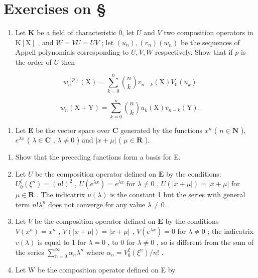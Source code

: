 \section*{Exercises on \S{}}
{}

\begin{enumerate}
\def\labelenumi{\arabic{enumi})}
\tightlist
\item
  Let \(\mathbf{K}\) be a field of characteristic 0, let \(U\) and \(V\) two composition operators in \(\mathrm{K}[\mathrm{X}]\) , and \(W = VU = UV\) ; let \((u_n), (v_n)(w_n)\) be the sequences of Appell polynomials corresponding to \(U, V, W\) respectively. Show that if \(p\) is the order of \(U\) then
\end{enumerate}

\[
w _ {n} ^ {(p)} (\mathrm{X}) = \sum_ {k = 0} ^ {n} \binom {n} {k} v _ {n - k} (\mathrm{X}) V _ {0} (u _ {k})
\]

\[
w _ {n} (\mathrm{X} + \mathrm{Y}) = \sum_ {k = 0} ^ {n} \binom {n} {k} u _ {k} (\mathrm{X}) v _ {n - k} (\mathrm{Y}).
\]

\begin{enumerate}
\def\labelenumi{\arabic{enumi})}
\setcounter{enumi}{1}
\tightlist
\item
  Let \(\mathbf{E}\) be the vector space over \(\mathbf{C}\) generated by the functions \(x^n\) ( \(n \in \mathbf{N}\) ), \(e^{\lambda x}\) ( \(\lambda \in \mathbf{C}\) , \(\lambda \neq 0\) ) and \(|x + \mu|\) ( \(\mu \in \mathbf{R}\) ).
\end{enumerate}

\begin{enumerate}
\def\labelenumi{\alph{enumi})}
\item
  Show that the preceding functions form a basis for E.
\item
  Let \(U\) be the composition operator defined on \(\mathbf{E}\) by the conditions: \(U_0^\xi (\xi^n) = (n!)^2\) , \(U(e^{\lambda x}) = e^{\lambda x}\) for \(\lambda \neq 0\) , \(U(|x + \mu|) = |x + \mu|\) for \(\mu \in \mathbf{R}\) . The indicatrix \(u(\lambda)\) is the constant 1 but the series with general term \(n!\lambda^n\) does not converge for any value \(\lambda \neq 0\) .
\item
  Let \(V\) be the composition operator defined on \(\mathbf{E}\) by the conditions \(V(x^n) = x^n\) , \(V(|x + \mu|) = |x + \mu|\) , \(V(e^{\lambda x}) = 0\) for \(\lambda \neq 0\) ; the indicatrix \(v(\lambda)\) is equal to 1 for \(\lambda = 0\) , to 0 for \(\lambda \neq 0\) , so is different from the sum of the series \(\sum_{n=0}^{\infty} \alpha_n \lambda^n\) where \(\alpha_n = V_0^\xi(\xi^n)/n!\) .
\item
  Let W be the composition operator defined on E by
\end{enumerate}


